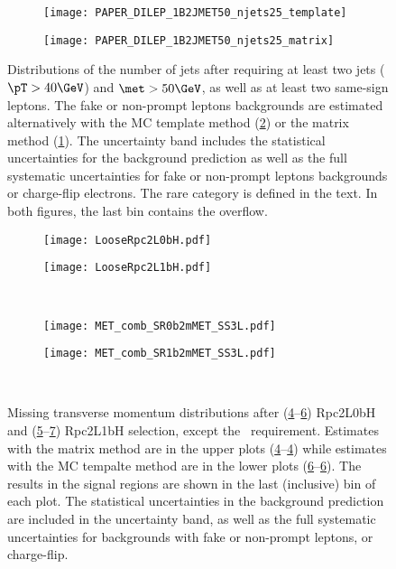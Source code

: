 \begin{figure}[htb!]
\begin{subfigure}[t]{0.49\textwidth}\texttt{[image: PAPER\_DILEP\_1B2JMET50\_njets25\_template]}\caption{}\label{fig:VR1b2j_MxM}\end{subfigure}
\begin{subfigure}[t]{0.49\textwidth}\texttt{[image: PAPER\_DILEP\_1B2JMET50\_njets25\_matrix]}\caption{}\label{fig:VR1b2j_MCT}\end{subfigure}
\caption{
Distributions of the number of jets after requiring at least two jets ($\pT> 40 \GeV$) and $\met> 50 \GeV$, 
as well as at least two same-sign leptons. 
The fake or non-prompt leptons backgrounds are estimated alternatively with the MC template method (\ref{fig:VR1b2j_MCT}) or the matrix method (\ref{fig:VR1b2j_MxM}). 
The uncertainty band includes the statistical uncertainties for the background prediction as well as the
full systematic uncertainties for fake or non-prompt leptons backgrounds or charge-flip electrons. 
The rare category is defined in the text. In both figures, the last bin contains the overflow.
}
\label{fig:bkg.val.mctVSmxm}
\end{figure}


\begin{figure}[htb!]
\begin{subfigure}[t]{0.49\textwidth}\texttt{[image: LooseRpc2L0bH.pdf]}\caption{}\label{fig:bkg.val.Rpc2L0bH.MxM}\end{subfigure}
\begin{subfigure}[t]{0.49\textwidth}\texttt{[image: LooseRpc2L1bH.pdf]}\caption{}\label{fig:bkg.val.Rpc2L1bH.MxM}\end{subfigure} \\
\begin{subfigure}[t]{0.49\textwidth}\texttt{[image: MET\_comb\_SR0b2mMET\_SS3L.pdf]}\caption{}\label{fig:bkg.val.Rpc2L0bH.MCT}\end{subfigure}
\begin{subfigure}[t]{0.49\textwidth}\texttt{[image: MET\_comb\_SR1b2mMET\_SS3L.pdf]}\caption{}\label{fig:bkg.val.Rpc2L1bH.MCT}\end{subfigure} \\
\caption{
Missing transverse momentum distributions after (\ref{fig:bkg.val.Rpc2L0bH.MxM}--\ref{fig:bkg.val.Rpc2L0bH.MCT}) Rpc2L0bH 
and (\ref{fig:bkg.val.Rpc2L1bH.MxM}--\ref{fig:bkg.val.Rpc2L1bH.MCT}) Rpc2L1bH selection, except the \met~requirement. 
Estimates with the matrix method are in the upper plots (\ref{fig:bkg.val.Rpc2L0bH.MxM}--\ref{fig:bkg.val.Rpc2L0bH.MxM})
while estimates with the MC tempalte method are in the lower plots (\ref{fig:bkg.val.Rpc2L0bH.MCT}--\ref{fig:bkg.val.Rpc2L0bH.MCT}).
The results in the signal regions are shown in the last (inclusive) bin of each plot. 
The statistical uncertainties in the background prediction are included in the uncertainty
band, as well as the full systematic uncertainties for backgrounds with fake or non-prompt leptons, or charge-flip.
}
\label{fig:bkg.val.met}
\end{figure}


